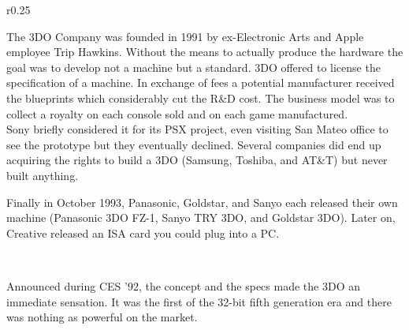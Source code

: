 \begin{wrapfigure}[14]{r}{0.25\textwidth}{
\centering {}}
\end{wrapfigure}
The 3DO Company was founded in 1991 by ex-Electronic Arts and Apple employee Trip Hawkins. Without the means to actually produce the hardware the goal was to develop not a machine but a standard. 3DO offered to license the specification of a machine. In exchange of fees a potential manufacturer received the blueprints which considerably cut the R\&D cost. The business model was to collect a royalty on each console sold and on each game manufactured.\\

 Sony briefly considered it for its PSX project, even visiting San Mateo office to see the prototype but they eventually declined. Several companies did end up acquiring the rights to build a 3DO (Samsung, Toshiba, and AT\&T) but never built anything.\\
 \par
Finally in October 1993, Panasonic, Goldstar, and Sanyo each released their own machine (Panasonic 3DO FZ-1, Sanyo TRY 3DO, and Goldstar 3DO). Later on, Creative released an ISA card you could plug into a PC.\\
\par
{}
\par
{}\\
\pagebreak



Announced during CES '92, the concept and the specs made the 3DO an immediate sensation. It was the first of the 32-bit fifth generation era and there was nothing as powerful on the market.\\
\par


\\

